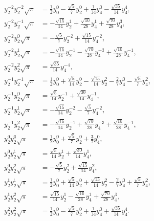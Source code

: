 \documentclass[11pt]{article}
\begin{document}
\begin{align}
y_2^{-2}y_2^{-2}\sqrt{\pi} &= \frac{1}{2 }y_0^{0} - \frac{\sqrt{5}}{7 }y_2^{0} + \frac{1}{14 }y_4^{0} - \frac{\sqrt{35}}{14 }y_4^{4} ,\\
y_2^{-2}y_2^{-1}\sqrt{\pi} &= - \frac{\sqrt{15}}{14 }y_2^{1} + \frac{\sqrt{10}}{28 }y_4^{1} + \frac{\sqrt{70}}{28 }y_4^{3} ,\\
y_2^{-2}y_2^{0}\sqrt{\pi} &= - \frac{\sqrt{5}}{7 }y_2^{-2} + \frac{\sqrt{15}}{14 }y_4^{-2} ,\\
y_2^{-2}y_2^{1}\sqrt{\pi} &= - \frac{\sqrt{15}}{14 }y_2^{-1} - \frac{\sqrt{70}}{28 }y_4^{-3} + \frac{\sqrt{10}}{28 }y_4^{-1} ,\\
y_2^{-2}y_2^{2}\sqrt{\pi} &= \frac{\sqrt{35}}{14 }y_4^{-4} ,\\
y_2^{-1}y_2^{-1}\sqrt{\pi} &= \frac{1}{2 }y_0^{0} + \frac{\sqrt{5}}{14 }y_2^{0} - \frac{\sqrt{15}}{14 }y_2^{2} - \frac{2}{7 }y_4^{0} - \frac{\sqrt{5}}{7 }y_4^{2} ,\\
y_2^{-1}y_2^{0}\sqrt{\pi} &= \frac{\sqrt{5}}{14 }y_2^{-1} + \frac{\sqrt{30}}{14 }y_4^{-1} ,\\
y_2^{-1}y_2^{1}\sqrt{\pi} &= - \frac{\sqrt{15}}{14 }y_2^{-2} - \frac{\sqrt{5}}{7 }y_4^{-2} ,\\
y_2^{-1}y_2^{2}\sqrt{\pi} &= - \frac{\sqrt{15}}{14 }y_2^{-1} + \frac{\sqrt{70}}{28 }y_4^{-3} + \frac{\sqrt{10}}{28 }y_4^{-1} ,\\
y_2^{0}y_2^{0}\sqrt{\pi} &= \frac{1}{2 }y_0^{0} + \frac{\sqrt{5}}{7 }y_2^{0} + \frac{3}{7 }y_4^{0} ,\\
y_2^{0}y_2^{1}\sqrt{\pi} &= \frac{\sqrt{5}}{14 }y_2^{1} + \frac{\sqrt{30}}{14 }y_4^{1} ,\\
y_2^{0}y_2^{2}\sqrt{\pi} &= - \frac{\sqrt{5}}{7 }y_2^{2} + \frac{\sqrt{15}}{14 }y_4^{2} ,\\
y_2^{1}y_2^{1}\sqrt{\pi} &= \frac{1}{2 }y_0^{0} + \frac{\sqrt{5}}{14 }y_2^{0} + \frac{\sqrt{15}}{14 }y_2^{2} - \frac{2}{7 }y_4^{0} + \frac{\sqrt{5}}{7 }y_4^{2} ,\\
y_2^{1}y_2^{2}\sqrt{\pi} &= \frac{\sqrt{15}}{14 }y_2^{1} - \frac{\sqrt{10}}{28 }y_4^{1} + \frac{\sqrt{70}}{28 }y_4^{3} ,\\
y_2^{2}y_2^{2}\sqrt{\pi} &= \frac{1}{2 }y_0^{0} - \frac{\sqrt{5}}{7 }y_2^{0} + \frac{1}{14 }y_4^{0} + \frac{\sqrt{35}}{14 }y_4^{4}.
\end{align}
\end{document}
